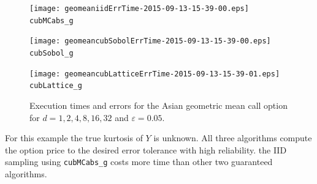 \documentclass{iitthesis}
\begin{document}
\begin{figure}
\centering
\begin{minipage}{9cm} \centering \texttt{[image: geomeaniidErrTime-2015-09-13-15-39-00.eps]} \\ {\tt cubMCabs\_g} \end{minipage}
\begin{minipage}{7cm} \centering \texttt{[image: geomeancubSobolErrTime-2015-09-13-15-39-00.eps]} \\ {\tt cubSobol\_g} \end{minipage}
\begin{minipage}{7cm} \centering \texttt{[image: geomeancubLatticeErrTime-2015-09-13-15-39-01.eps]} \\ {\tt cubLattice\_g} \end{minipage}
\caption{Execution times and errors for the Asian geometric mean call option for $d=1, 2, 4, 8, 16, 32$ and $\varepsilon=0.05$.\label{fig:GeoMeanAsianOptionabstol}}
\end{figure}

For this example the true kurtosis of $Y$ is unknown.  
All three algorithms compute the option price to the desired error tolerance with high reliability.  the IID sampling using {\tt cubMCabs\_g} costs more time than other two guaranteed algorithms.

\end{document}

